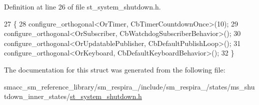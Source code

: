 Definition at line 26 of file st\+\_\+system\+\_\+shutdown.\+h.


\begin{DoxyCode}
27     \{
28         configure\_orthogonal<OrTimer, CbTimerCountdownOnce>(10);
29         configure\_orthogonal<OrSubscriber, CbWatchdogSubscriberBehavior>();
30         configure\_orthogonal<OrUpdatablePublisher, CbDefaultPublishLoop>();
31         configure\_orthogonal<OrKeyboard, CbDefaultKeyboardBehavior>();
32     \}
\end{DoxyCode}


The documentation for this struct was generated from the following file\+:\begin{DoxyCompactItemize}
\item 
smacc\+\_\+sm\+\_\+reference\+\_\+library/sm\+\_\+respira\+\_/include/sm\+\_\+respira\+\_/states/ms\+\_\+shutdown\+\_\+inner\+\_\+states/\hyperlink{st__system__shutdown_8h}{st\+\_\+system\+\_\+shutdown.\+h}\end{DoxyCompactItemize}
